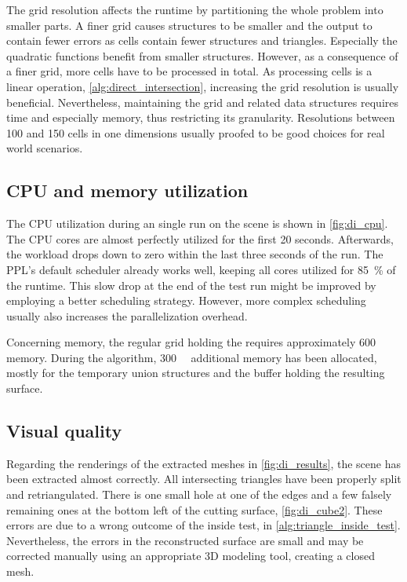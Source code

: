 The grid resolution affects the runtime by partitioning the whole problem into smaller parts.
A finer grid causes structures to be smaller and the output to contain fewer errors as cells contain fewer structures and triangles.
Especially the quadratic functions benefit from smaller structures.
However, as a consequence of a finer grid, more cells have to be processed in total.
As processing cells is a linear operation, \cf \cref{alg:direct_intersection}, increasing the grid resolution is usually beneficial.
Nevertheless, maintaining the grid and related data structures requires time and especially memory, thus restricting its granularity.
Resolutions between 100 and 150 cells in one dimensions usually proofed to be good choices for real world scenarios.


\subsection{CPU and memory utilization}

The CPU utilization during an single run on the \impeller scene is shown in \cref{fig:di_cpu}.
The CPU cores are almost perfectly utilized for the first 20 seconds.
Afterwards, the workload drops down to zero within the last three seconds of the run.
The PPL's default scheduler already works well, keeping all cores utilized for \SI{85}{\percent} of the runtime.
This slow drop at the end of the test run might be improved by employing a better scheduling strategy.
However, more complex scheduling usually also increases the parallelization overhead.

Concerning memory, the regular grid holding the \impeller requires approximately \SI{600}{\mebi\byte} memory.
During the algorithm, \SI{300}{\mebi\byte} additional memory has been allocated, mostly for the temporary union structures and the buffer holding the resulting surface.


\subsection{Visual quality}

Regarding the renderings of the extracted meshes in \cref{fig:di_results}, the \cubes scene has been extracted almost correctly.
All intersecting triangles have been properly split and retriangulated.
There is one small hole at one of the edges and a few falsely remaining ones at the bottom left of the cutting surface, \cf \cref{fig:di_cube2}.
These errors are due to a wrong outcome of the inside test, \cf {} in \cref{alg:triangle_inside_test}.
Nevertheless, the errors in the reconstructed surface are small and may be corrected manually using an appropriate 3D modeling tool, creating a closed mesh.

